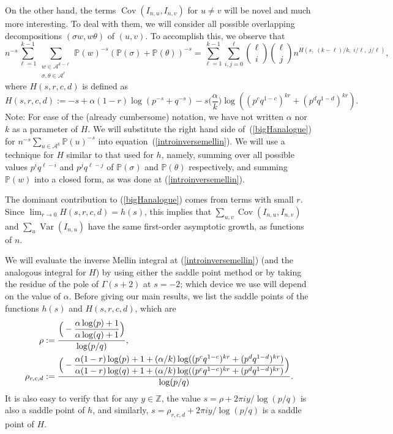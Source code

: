 \documentclass[proceedings]{aofa}
\def\Var{\mathop{\operatorname{Var}}}
\def\Cov{\mathop{\operatorname{Cov}}}
\newcommand{\Iu}{I_{n,u}}
\newcommand{\Iv}{I_{n,v}}
\newcommand{\pro}{\mathbb{P}}
\newcommand{\A}{\mathcal{A}}
\newcommand{\Pu}{\pro(u)}
\newcommand{\ds}{\displaystyle}
\def\Cov{\mathop{\operatorname{Cov}}}
\newcommand{\Ptheta}{\pro(\theta)}
\newcommand{\Psigma}{\pro(\sigma)}
\newcommand{\Pw}{\pro(w)}
\begin{document}
On the other hand, the terms $\Cov(\Iu,\Iv)$ for $u \neq v$  will be
novel and much more interesting. To deal with them, we will consider
all possible overlapping decompositions $(\sigma w, w\theta)$ of
$(u,v)$.  To accomplish this, we observe that 
\begin{equation}\label{bigHanalogue}
n^{-s}\sum_{\ell=1}^{k-1}\sum_{\substack{ w \in \A^{k-\ell} \\ \sigma,\theta \in \A^{\ell}}}\Pw^{-s}(\Psigma+\Ptheta)^{-s}=\sum_{\ell=1}^{k-1}\sum_{i,j=0}^{\ell}{\ell \choose i}{\ell \choose j}n^{H(s,\;(k-\ell)/k,\;i/\ell,\; j/\ell)},
\end{equation}
where $H(s,r,c,d)$ is defined as
\begin{equation*}
H(s,r,c,d) := -s+\alpha(1-r)\log(p^{-s}+q^{-s})- s\Big(\frac{\alpha}{k}\Big)\log( (p^{c}q^{1-c})^{kr} + (p^{d}q^{1-d})^{kr}).
\end{equation*}
Note: For ease of the (already cumbersome) notation, we have not written
$\alpha$ nor $k$ as a parameter of $H$.
We will substitute the right hand side of~(\ref{bigHanalogue}) for 
$n^{-s}\sum_{u\in\mathcal{A}^{k}} \Pu^{-s}$ into equation~(\ref{introinversemellin}).
We will use a technique for $H$ similar to that used for $h$, namely, summing over all
possible values $p^{i}q^{\ell-i}$ and $p^{j}q^{\ell-j}$ of $\Psigma$
and $\Ptheta$ respectively, and summing $\Pw$ into a closed form, as
was done at (\ref{introinversemellin}).

The dominant contribution to (\ref{bigHanalogue}) comes from terms
with small $r$. Since $\lim_{r \rightarrow 0}H(s,r,c,d)=h(s)$, this
implies that $\sum_{u,v}\Cov(\Iu,\Iv)$ and $\sum_{u}\Var(\Iu)$ have
the same first-order asymptotic growth, as functions of $n$.

We will evaluate the inverse Mellin integral at
(\ref{introinversemellin}) (and the analogous integral for $H$) by using either the saddle point method or by taking the residue of the pole of $\Gamma(s+2)$ at $s=-2$; which device we use will depend on the value of $\alpha$. Before giving our main results, we list the saddle points of the functions $h(s)$ and $H(s,r,c,d)$, which are
\begin{align}\label{rhodef}
\rho&:= \ds\frac{\Big(-\ds\frac{\alpha\log(p)+1}{\alpha\log(q)+1}\Big)}{\log(p/q)},\notag\\
\rho_{r,c,d}&:=\ds\frac{\Big(-\ds\frac{\alpha(1-r)\log(p)+1+(\alpha/k)\log( (p^{c}q^{1-c})^{kr} + (p^{d}q^{1-d})^{kr})}{\alpha(1-r)\log(q)+1+(\alpha/k)\log( (p^{c}q^{1-c})^{kr} + (p^{d}q^{1-d})^{kr})}\Big)}{\log(p/q)}.
\end{align}
It is also easy to verify that for any $y \in \mathbb{Z}$, the value
$s=\rho+2\pi i y/\log(p/q)$ is also a saddle point of $h$, and
similarly, $s=\rho_{r,c,d}+2\pi i y/\log(p/q)$ is a saddle point of $H$.
\end{document}
